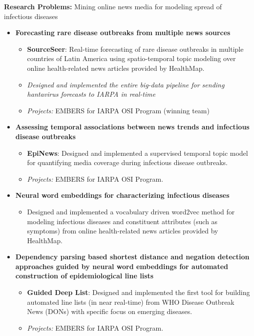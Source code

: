 \par{\textbf{Research Problems:} Mining online news media for modeling spread of infectious diseases\vspace{0.5em}
\begin{itemize}
 \item  \textbf{Forecasting rare disease outbreaks from multiple news sources}
   \begin{itemize}
     \item {\textbf{SourceSeer}}: Real-time forecasting of rare disease outbreaks in multiple countries of Latin America 
       using spatio-temporal topic modeling over online health-related news articles provided by HealthMap.
     \item \textit{Designed and implemented the entire big-data pipeline for sending hantavirus forecasts to IARPA in real-time}  
     \item \textit{Projects:} EMBERS for IARPA OSI Program (winning team)
   \end{itemize}\vspace{0.25em}
 \item \textbf{Assessing temporal associations between news trends and infectious disease outbreaks}
   \begin{itemize}
     \item {\textbf{EpiNews}}: Designed and implemented a supervised temporal topic 
       model for quantifying media coverage during infectious disease outbreaks.
     \item \textit{Projects:} EMBERS for IARPA OSI Program.
   \end{itemize}\vspace{0.25em}
 \item \textbf{Neural word embeddings for characterizing infectious diseases}
   \begin{itemize}
     \item Designed and implemented a vocabulary driven word2vec method for modeling infectious diseases and constituent attributes (such as symptoms)
           from online health-related news articles provided by HealthMap.
   \end{itemize}
 \item \textbf{Dependency parsing based shortest distance and negation detection approaches guided by neural word embeddings for automated construction of epidemiological line lists}
   \begin{itemize}
     \item {\textbf{Guided Deep List}}: Designed and implemented the first tool for building automated line lists (in near real-time) from
       WHO Disease Outbreak News (DONs) with specific focus on emerging diseases.
     \item \textit{Projects:} EMBERS for IARPA OSI Program.
   \end{itemize}
\end{itemize}
}
